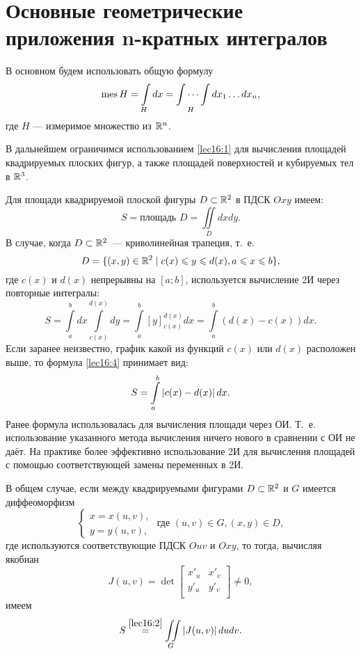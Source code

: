 \documentclass[../../main.tex]{subfiles}
\begin{document}
\section{Основные геометрические приложения n-кратных интегралов}

В основном будем использовать общую формулу
\begin{equation}
\label{lec16:1}
\operatorname{mes} H = \int\limits_Hdx = \idotsint\limits_H dx_1 \ldots dx_n,
\end{equation}
где $H$ --- измеримое множество из $\mathbb{R}^n$.

В дальнейшем ограничимся
использованием \eqref{lec16:1} для вычисления площадей квадрируемых плоских
фигур, а также площадей поверхностей и кубируемых тел в $\mathbb{R}^{3}$.

Для площади квадрируемой плоской фигуры $D \subset \mathbb{R}^{2}$ в ПДСК
$Oxy$ имеем:
\begin{equation}
\label{lec16:2}
S = \text{площадь } D = \iint\limits_Ddxdy.
\end{equation}
В случае, когда $D \subset \mathbb{R}^{2}$~--- криволинейная трапеция, т.~е. 
\begin{equation}
\label{lec16:3}
	D=\{
	(x,y)\in \mathbb{R}^2 \mid c(x)\leqslant y\leqslant d(x), a\leqslant x \leqslant b
	\},
\end{equation}
где $c(x)$ и $d(x)$ непрерывны на $\left[a; b\right]$,
 используется вычисление 2И через повторные интегралы:
\begin{equation}
\label{lec16:4}
S = \int\limits_a^bdx\int\limits_{c(x)}^{d(x)}dy = 
\int\limits_a^b\left[y\right]^{d(x)}_{c(x)}dx
=\int\limits_a^b(d(x) - c(x))dx.
\end{equation}
Если заранее неизвестно, график какой из функций $c(x)$ или $d(x)$ 
расположен выше, то формула \eqref{lec16:4} принимает вид:
\begin{equation}
\label{lec16:5}
S =  \int\limits_a^b\left|{c(x) - d(x)}\right|dx.
\end{equation}
Ранее формула использовалась для вычисления
 площади через ОИ. Т.~е. использование
  указанного метода вычисления {ничего нового}
в сравнении с ОИ не даёт. На практике
 более эффективно использование 2И для
  вычисления площадей с помощью соответствующей замены переменных в 2И.


В общем случае, если между квадрируемыми фигурами 
$D\subset \mathbb{R}^2$ и $G$ имеется диффеоморфизм
\begin{equation*}
\begin{cases}
x = x(u, v), \\
y = y(u, v),
\end{cases}
\text{ где }  (u, v) \in G, (x, y) \in D,
\end{equation*}
где используются соответствующие ПДСК $Ouv$ и $Oxy$, 
то тогда, вычисляя якобиан
\begin{equation*}
J(u,v) = \det
\begin{bmatrix}
x'_u & x'_v\\
y'_u & y'_v\\
\end{bmatrix}
\neq 0,
\end{equation*}
имеем
\begin{equation}
\label{lec16:6}
S \overset{\ref{lec16:2}}{=} \iint\limits_G \left|{ J(u,v)}\right| dudv.
\end{equation}
\end{document}
